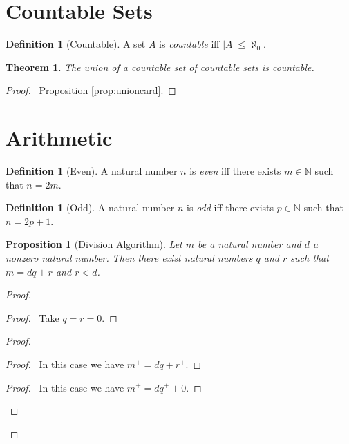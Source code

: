 \documentclass{book}
\let\qed\relax
\newtheorem{prop}[ax]{Proposition}
\newtheorem{thm}[ax]{Theorem}
\theoremstyle{definition}
\newtheorem{df}[ax]{Definition}
\begin{document}
\section{Countable Sets}

\begin{df}[Countable]
A set $A$ is \emph{countable} iff $|A| \leq \aleph_0$.
\end{df}

\begin{thm}
The union of a countable set of countable sets is countable.
\end{thm}

\begin{proof}
\pf\ Proposition \ref{prop:unioncard}. \qed
\end{proof}

\section{Arithmetic}

\begin{df}[Even]
A natural number $n$ is \emph{even} iff there exists $m \in \mathbb{N}$ such that $n = 2m$.
\end{df}

\begin{df}[Odd]
A natural number $n$ is \emph{odd} iff there exists $p \in \mathbb{N}$ such that $n = 2p+1$.
\end{df}

\begin{prop}[Division Algorithm]
Let $m$ be a natural number and $d$ a nonzero natural number. Then there exist natural numbers $q$ and $r$ such that $m = dq + r$ and $r < d$.
\end{prop}

\begin{proof}
\pf
{}
\begin{proof}
	\pf\ Take $q = r = 0$.
\end{proof}
\begin{proof}
	\begin{proof}
		\pf\ In this case we have $m^+ = dq + r^+$.
	\end{proof}
	\begin{proof}
		\pf\ In this case we have $m^+ = dq^+ + 0$.
	\end{proof}
\end{proof}
\qed
\end{proof}
\end{document}
